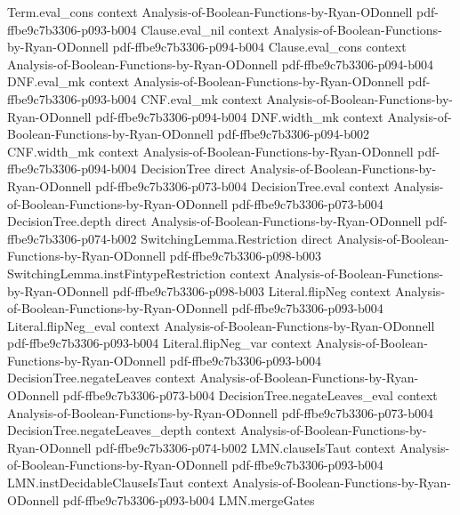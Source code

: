 \begin{lemma}
\proofstep
  {Term.eval_cons}
  {context}
  {Analysis-of-Boolean-Functions-by-Ryan-ODonnell}
  {pdf-ffbe9c7b3306-p093-b004}
\proofstep
  {Clause.eval_nil}
  {context}
  {Analysis-of-Boolean-Functions-by-Ryan-ODonnell}
  {pdf-ffbe9c7b3306-p094-b004}
\proofstep
  {Clause.eval_cons}
  {context}
  {Analysis-of-Boolean-Functions-by-Ryan-ODonnell}
  {pdf-ffbe9c7b3306-p094-b004}
\proofstep
  {DNF.eval_mk}
  {context}
  {Analysis-of-Boolean-Functions-by-Ryan-ODonnell}
  {pdf-ffbe9c7b3306-p093-b004}
\proofstep
  {CNF.eval_mk}
  {context}
  {Analysis-of-Boolean-Functions-by-Ryan-ODonnell}
  {pdf-ffbe9c7b3306-p094-b004}
\proofstep
  {DNF.width_mk}
  {context}
  {Analysis-of-Boolean-Functions-by-Ryan-ODonnell}
  {pdf-ffbe9c7b3306-p094-b002}
\proofstep
  {CNF.width_mk}
  {context}
  {Analysis-of-Boolean-Functions-by-Ryan-ODonnell}
  {pdf-ffbe9c7b3306-p094-b004}
\proofstep
  {DecisionTree}
  {direct}
  {Analysis-of-Boolean-Functions-by-Ryan-ODonnell}
  {pdf-ffbe9c7b3306-p073-b004}
\proofstep
  {DecisionTree.eval}
  {context}
  {Analysis-of-Boolean-Functions-by-Ryan-ODonnell}
  {pdf-ffbe9c7b3306-p073-b004}
\proofstep
  {DecisionTree.depth}
  {direct}
  {Analysis-of-Boolean-Functions-by-Ryan-ODonnell}
  {pdf-ffbe9c7b3306-p074-b002}
\proofstep
  {SwitchingLemma.Restriction}
  {direct}
  {Analysis-of-Boolean-Functions-by-Ryan-ODonnell}
  {pdf-ffbe9c7b3306-p098-b003}
\proofstep
  {SwitchingLemma.instFintypeRestriction}
  {context}
  {Analysis-of-Boolean-Functions-by-Ryan-ODonnell}
  {pdf-ffbe9c7b3306-p098-b003}
\proofstep
  {Literal.flipNeg}
  {context}
  {Analysis-of-Boolean-Functions-by-Ryan-ODonnell}
  {pdf-ffbe9c7b3306-p093-b004}
\proofstep
  {Literal.flipNeg_eval}
  {context}
  {Analysis-of-Boolean-Functions-by-Ryan-ODonnell}
  {pdf-ffbe9c7b3306-p093-b004}
\proofstep
  {Literal.flipNeg_var}
  {context}
  {Analysis-of-Boolean-Functions-by-Ryan-ODonnell}
  {pdf-ffbe9c7b3306-p093-b004}
\proofstep
  {DecisionTree.negateLeaves}
  {context}
  {Analysis-of-Boolean-Functions-by-Ryan-ODonnell}
  {pdf-ffbe9c7b3306-p073-b004}
\proofstep
  {DecisionTree.negateLeaves_eval}
  {context}
  {Analysis-of-Boolean-Functions-by-Ryan-ODonnell}
  {pdf-ffbe9c7b3306-p073-b004}
\proofstep
  {DecisionTree.negateLeaves_depth}
  {context}
  {Analysis-of-Boolean-Functions-by-Ryan-ODonnell}
  {pdf-ffbe9c7b3306-p074-b002}
\proofstep
  {LMN.clauseIsTaut}
  {context}
  {Analysis-of-Boolean-Functions-by-Ryan-ODonnell}
  {pdf-ffbe9c7b3306-p093-b004}
\proofstep
  {LMN.instDecidableClauseIsTaut}
  {context}
  {Analysis-of-Boolean-Functions-by-Ryan-ODonnell}
  {pdf-ffbe9c7b3306-p093-b004}
\proofstep
  {LMN.mergeGates}

\end{lemma}
